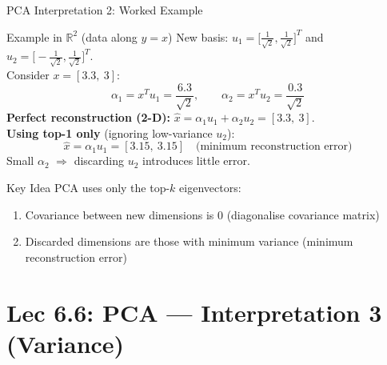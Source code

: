 \documentclass{beamer}
\begin{document}
\begin{frame}[shrink=10]{PCA Interpretation 2: Worked Example}
  \begin{exampleblock}{Example in $\mathbb{R}^2$ (data along $y=x$)}
    New basis:
    $u_1 = \bigl[\tfrac{1}{\sqrt{2}},\tfrac{1}{\sqrt{2}}\bigr]^T$
    and
    $u_2 = \bigl[-\tfrac{1}{\sqrt{2}},\tfrac{1}{\sqrt{2}}\bigr]^T$.\\[6pt]
    Consider $x = [3.3,\ 3]$:
    \[
      \alpha_1 = x^Tu_1 = \frac{6.3}{\sqrt{2}},
      \qquad
      \alpha_2 = x^Tu_2 = \frac{0.3}{\sqrt{2}}
    \]
    \textbf{Perfect reconstruction (2-D):}
    $\hat{x} = \alpha_1 u_1 + \alpha_2 u_2 = [3.3,\ 3]$.\\[6pt]
    \textbf{Using top-1 only} (ignoring low-variance $u_2$):
    \[
      \hat{x} = \alpha_1 u_1 = [3.15,\ 3.15]
      \quad\text{(minimum reconstruction error)}
    \]
    Small $\alpha_2$ $\Rightarrow$ discarding $u_2$ introduces little
    error.
  \end{exampleblock}

  \medskip

  \begin{block}{Key Idea}
    PCA uses only the top-$k$ eigenvectors:
    \begin{enumerate}\setlength\itemsep{4pt}
      \item Covariance between new dimensions is 0
            (diagonalise covariance matrix)
      \item Discarded dimensions are those with minimum variance
            (minimum reconstruction error)
    \end{enumerate}
  \end{block}
\end{frame}

\section{Lec 6.6: PCA --- Interpretation 3 (Variance)}
\end{document}
